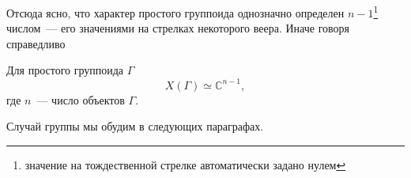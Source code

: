     Отсюда ясно, что характер простого группоида 
    однозначно определен $n-1$\footnote{значение на тождественной стрелке 
    автоматически задано нулем} числом~--- его значениями на стрелках некоторого 
    веера. Иначе говоря справедливо

    \begin{statement}\label{st_smp_grp_char} Для простого группоида $\Gamma$
        \[X(\Gamma) \simeq \mathbb{C}^{n-1},\]
        где $n$~--- число объектов $\Gamma$.
    \end{statement}

    Случай группы мы обудим в следующих параграфах.
